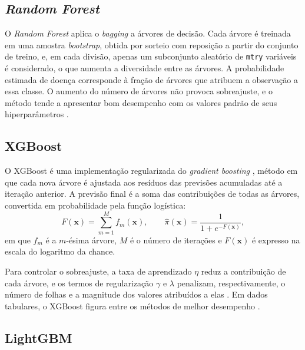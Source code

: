 \subsection{\textit{Random Forest}}
\label{sec:fund_rf}

O \textit{Random Forest} \cite{Breiman2001RandomForests} aplica o \textit{bagging} a árvores de decisão. Cada árvore é treinada em uma amostra \textit{bootstrap}, obtida por sorteio com reposição a partir do conjunto de treino, e, em cada divisão, apenas um subconjunto aleatório de \texttt{mtry} variáveis é considerado, o que aumenta a diversidade entre as árvores. A probabilidade estimada de doença corresponde à fração de árvores que atribuem a observação a essa classe. O aumento do número de árvores não provoca sobreajuste, e o método tende a apresentar bom desempenho com os valores padrão de seus hiperparâmetros \cite{Breiman2001RandomForests, Probst2019Hyperparameters}.

\subsection{XGBoost}
\label{sec:fund_xgb}

O XGBoost \cite{Chen2016XGBoost} é uma implementação regularizada do \textit{gradient boosting} \cite{Friedman2001Greedy}, método em que cada nova árvore é ajustada aos resíduos das previsões acumuladas até a iteração anterior. A previsão final é a soma das contribuições de todas as árvores, convertida em probabilidade pela função logística:
\begin{equation}
    F(\mathbf{x}) = \sum_{m=1}^{M} f_m(\mathbf{x}),
    \qquad
    \hat{\pi}(\mathbf{x}) = \frac{1}{1 + e^{-F(\mathbf{x})}},
    \label{eq:boosting}
\end{equation}
em que $f_m$ é a $m$-ésima árvore, $M$ é o número de iterações e $F(\mathbf{x})$ é expresso na escala do logaritmo da chance.

Para controlar o sobreajuste, a taxa de aprendizado $\eta$ reduz a contribuição de cada árvore, e os termos de regularização $\gamma$ e $\lambda$ penalizam, respectivamente, o número de folhas e a magnitude dos valores atribuídos a elas \cite{Chen2016XGBoost}. Em dados tabulares, o XGBoost figura entre os métodos de melhor desempenho \cite{Grinsztajn2022Why}.

\subsection{LightGBM}
\label{sec:fund_lgbm}

